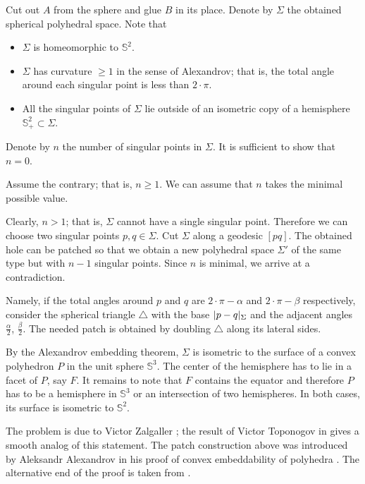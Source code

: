 Cut out $A$ from the sphere and glue $B$ in its place.
Denote by $\Sigma$ the obtained spherical polyhedral space.
Note that 
\begin{itemize}
\item $\Sigma$ is homeomorphic to $\mathbb S^2$.
\item $\Sigma$ has curvature $\ge 1$ in the sense of Alexandrov; that is, the total angle around each singular point is less than $2\cdot \pi$.
\item All the singular points of $\Sigma$ 
lie outside of an isometric copy of a hemisphere $\mathbb{S}^2_+\subset \Sigma$.
\end{itemize}

Denote by $n$ the number of singular points in $\Sigma$.
It is sufficient to show that $n=0$.

Assume the contrary; that is, $n\ge 1$.
We can assume that $n$ takes the minimal possible value.

Clearly, $n>1$;
that is, $\Sigma$ cannot have a single singular point.
Therefore we can choose two singular points $p,q\in \Sigma$.
Cut $\Sigma$ along a geodesic $[pq]$.
The obtained hole can be patched so that we obtain a new polyhedral space $\Sigma'$ of the same type but with $n-1$ singular points.
Since $n$ is minimal, we arrive at a contradiction.

Namely, if the total angles around $p$ and $q$ are $2\cdot \pi-\alpha$ and $2\cdot \pi-\beta$ respectively,
consider the spherical triangle $\triangle$ with the base $|p\z-q|_\Sigma$ and the adjacent angles $\tfrac\alpha2$, $\tfrac\beta2$. 
The needed patch is obtained by doubling $\triangle$ along its lateral sides.
\qeds

By the Alexandrov embedding theorem, $\Sigma$ is isometric to the surface of a convex polyhedron $P$ in the unit sphere $\mathbb S^3$. 
The center of the hemisphere has to lie in a facet of $P$, say $F$.
It remains to note that $F$ contains the equator and therefore $P$ has to be a hemisphere in $\mathbb S^3$ or an intersection of two hemispheres.
In both cases, its surface is isometric to $\mathbb S^2$.
\qeds

The problem is due to Victor Zalgaller \cite{zalgaller-shperical-polygon};
the result of Victor Toponogov in \cite{toponogov} gives a smooth analog of this statement.
The patch construction above was introduced by 
Aleksandr Alexandrov
in his proof of convex embeddability of polyhedra
\cite[see VI, \S7 in][]{alexandrov1948}.
The alternative end of the proof is taken from \cite{panov-petrunin}.



